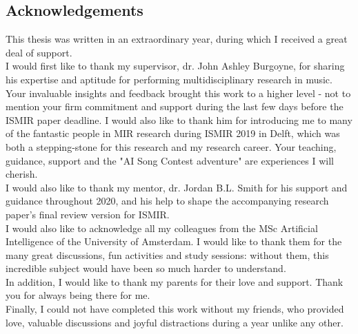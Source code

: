 
\begin{fullwidth}
    \section*{Acknowledgements}
    This thesis was written in an extraordinary year, during which I received a great deal of support.\\

    I would first like to thank my supervisor, dr. John Ashley Burgoyne, for sharing his expertise and aptitude for performing multidisciplinary research in music. Your invaluable insights and feedback brought this work to a higher level - not to mention your firm commitment and support during the last few days before the ISMIR paper deadline. I would also like to thank him for introducing me to many of the fantastic people in MIR research during ISMIR 2019 in Delft, which was both a stepping-stone for this research and my research career. Your teaching, guidance, support and the "AI Song Contest adventure" are experiences I will cherish.\\

    I would also like to thank my mentor, dr. Jordan B.L. Smith for his support and guidance throughout 2020, and his help to shape the accompanying research paper's final review version for ISMIR.\\

    I would also like to acknowledge all my colleagues from the MSc Artificial Intelligence of the University of Amsterdam. I would like to thank them for the many great discussions, fun activities and study sessions: without them, this incredible subject would have been so much harder to understand.\\

    In addition, I would like to thank my parents for their love and support. Thank you for always being there for me.\\
    
    Finally, I could not have completed this work without my friends, who provided love, valuable discussions and joyful distractions during a year unlike any other.\\
\end{fullwidth}
